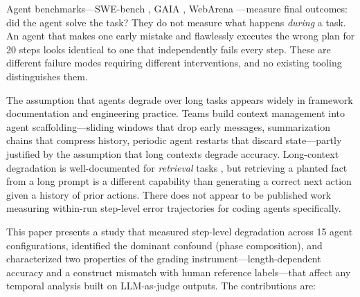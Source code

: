\documentclass[11pt]{article}
\begin{document}
Agent benchmarks---SWE-bench \citep{jimenez2024swebench}, GAIA \citep{mialon2023gaia}, WebArena \citep{zhou2024webarena}---measure final outcomes: did the agent solve the task?
They do not measure what happens \emph{during} a task.
An agent that makes one early mistake and flawlessly executes the wrong plan for 20 steps looks identical to one that independently fails every step.
These are different failure modes requiring different interventions, and no existing tooling distinguishes them.

The assumption that agents degrade over long tasks appears widely in framework documentation and engineering practice.
Teams build context management into agent scaffolding---sliding windows that drop early messages, summarization chains that compress history, periodic agent restarts that discard state---partly justified by the assumption that long contexts degrade accuracy.
Long-context degradation is well-documented for \emph{retrieval} tasks \citep{liu2024lost}, but retrieving a planted fact from a long prompt is a different capability than generating a correct next action given a history of prior actions.
There does not appear to be published work measuring within-run step-level error trajectories for coding agents specifically.

This paper presents a study that measured step-level degradation across 15 agent configurations, identified the dominant confound (phase composition), and characterized two properties of the grading instrument---length-dependent accuracy and a construct mismatch with human reference labels---that affect any temporal analysis built on LLM-as-judge outputs.
The contributions are:
\end{document}
